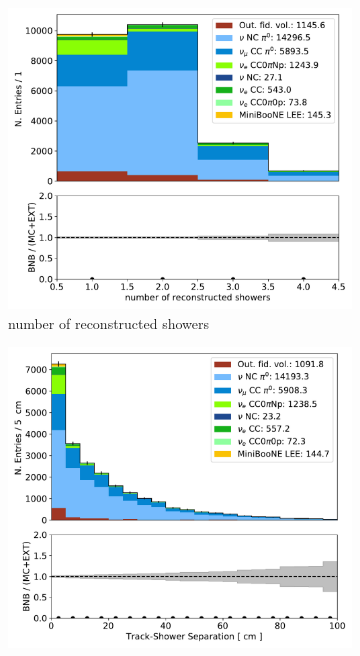 \documentclass[a4paper]{article}
\begin{document}
\begin{figure}[ht] 
\begin{center}
    \begin{subfigure}[b]{0.31\textwidth}
    \centering
    \includegraphics[width=1.00\textwidth]{egamma/n_showers_contained_01022020.pdf}
    \caption{number of reconstructed showers}
    \end{subfigure}
    \begin{subfigure}[b]{0.31\textwidth}
    \centering
    \includegraphics[width=1.00\textwidth]{egamma/tksh_distance_01022020.pdf}

\end{subfigure}
\end{center}
\end{figure}
\end{document}
